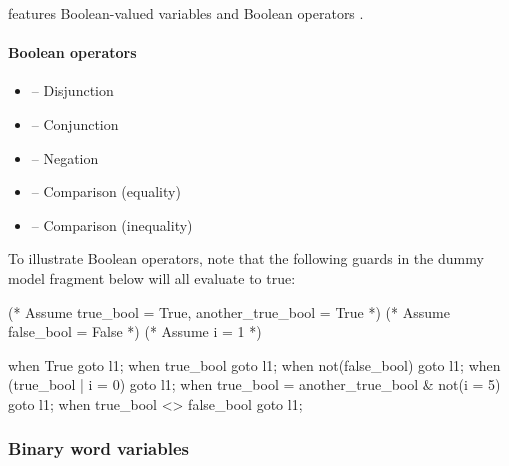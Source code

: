 \imitator{} features Boolean-valued variables and Boolean operators 	.

\paragraph{Boolean operators}

\begin{itemize}
	\item {} -- Disjunction
	\item {} -- Conjunction
	\item {} -- Negation
	\item {} -- Comparison (equality)
	\item {} -- Comparison (inequality)
\end{itemize}



\begin{example}
	To illustrate Boolean operators, note that the following guards in the dummy model fragment below will all evaluate to true:

	\begin{IMITATORmodel}

		(* Assume true_bool = True, another_true_bool = True *)
		(* Assume false_bool = False *)
		(* Assume i = 1 *)

		when True goto l1;
		when true_bool goto l1;
		when not(false_bool) goto l1;
		when (true_bool | i = 0) goto l1;
		when true_bool = another_true_bool & not(i = 5) goto l1;
		when true_bool <> false_bool goto l1;

	\end{IMITATORmodel}
\end{example}



\subsubsection{Binary word variables}

